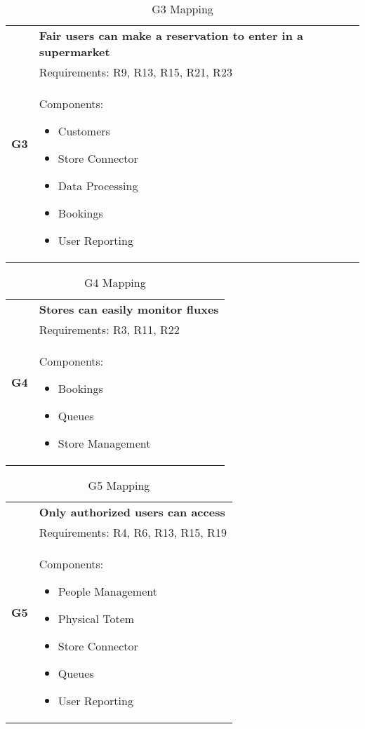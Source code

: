 \begin{table}[H]
	\begin{tabular}{|c|p{14cm}|}
		\hline
		\multirow{3}{*}[-3em]{\textbf{G3}} & \cellcolor{Dandelion} \textbf{Fair users can make a reservation to enter in a supermarket}\\ \cline{2-2}
		& \cellcolor{GreenYellow} Requirements: R9, R13, R15, R21, R23\\ \cline{2-2}
		& \cellcolor{SkyBlue} Components: \begin{itemize}
			\item Customers
			\item Store Connector
			\item Data Processing
			\item Bookings
			\item User Reporting
		\end{itemize}\\ \hline
	\end{tabular}
	\label{tab:G3Mapping}
	\caption{G3 Mapping}
\end{table}

\begin{table}[H]
	\begin{tabular}{|c|p{14cm}|}
		\hline
		\multirow{3}{*}[-3em]{\textbf{G4}} & \cellcolor{Dandelion} \textbf{Stores can easily monitor fluxes}\\ \cline{2-2}
		& \cellcolor{GreenYellow} Requirements: R3, R11, R22\\ \cline{2-2}
		& \cellcolor{SkyBlue} Components: \begin{itemize}
			\item Bookings
			\item Queues
			\item Store Management
		\end{itemize}\\ \hline
	\end{tabular}
	\label{tab:G4Mapping}
	\caption{G4 Mapping}
\end{table}

\begin{table}[H]
	\begin{tabular}{|c|p{14cm}|}
		\hline
		\multirow{3}{*}[-3em]{\textbf{G5}} & \cellcolor{Dandelion} \textbf{Only authorized users can access}\\ \cline{2-2}
		& \cellcolor{GreenYellow} Requirements: R4, R6, R13, R15, R19 \\ \cline{2-2}
		& \cellcolor{SkyBlue} Components: \begin{itemize}
			\item People Management
			\item Physical Totem
			\item Store Connector
			\item Queues
			\item User Reporting
		\end{itemize}\\ \hline
	\end{tabular}
	\label{tab:G5Mapping}
	\caption{G5 Mapping}
\end{table}

